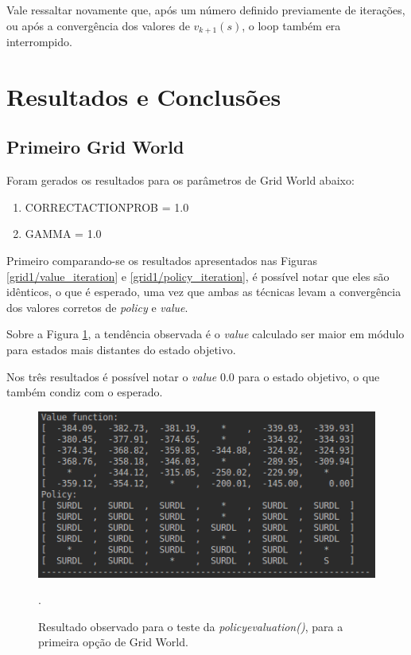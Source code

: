 \documentclass[conference]{IEEEtran}
\begin{document}
Vale ressaltar novamente que, após um número definido previamente de iterações, ou após a convergência dos valores de $v_{k+1}(s)$, o loop também era interrompido.

\section{Resultados e Conclusões}

\subsection{Primeiro Grid World}
Foram gerados os resultados para os parâmetros de Grid World abaixo:

\begin{enumerate}
\item CORRECT\underline{\space}ACTION\underline{\space}PROB = 1.0

\item GAMMA = 1.0
\end{enumerate}

Primeiro comparando-se os resultados apresentados nas Figuras \ref{grid1/value_iteration} e \ref{grid1/policy_iteration}, é possível notar que eles são idênticos, o que é esperado, uma vez que ambas as técnicas levam a convergência dos valores corretos de \textit{policy} e \textit{value}.

Sobre a Figura \ref{grid1/policy_evaluation}, a tendência observada é o \textit{value} calculado ser maior em módulo para estados mais distantes do estado objetivo.

Nos três resultados é possível notar o \textit{value} 0.0 para o estado objetivo, o que também condiz com o esperado. 

\begin{figure}[htbp]
\centering
\centerline{\includegraphics[scale=0.5]{imagens/grid1/policy_evaluation.png}}
\caption{Resultado observado para o teste da \textit{policy\underline{\space}evaluation()}, para a primeira opção de Grid World.}.
\label{grid1/policy_evaluation}
\end{figure}
\end{document}

